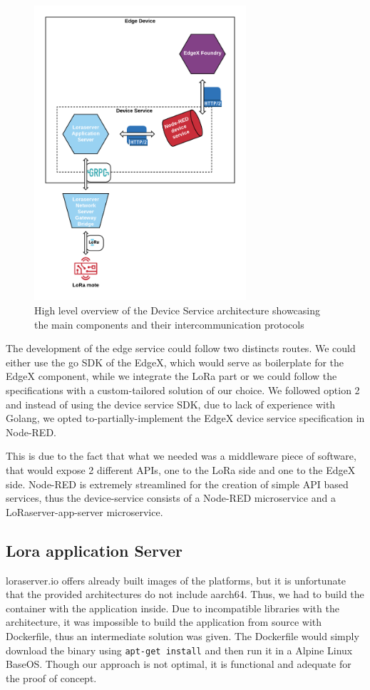 \begin{figure}[h]
    \centering
    \includegraphics[width=0.7\textwidth]{images/dev_serv_arch.png}
    \caption{High level overview of the Device Service architecture showcasing the main components and their intercommunication protocols}
    \label{fig:device_service}
\end{figure}

The development of the edge service could follow two distincts routes. We could either use the go SDK of the EdgeX, which would serve as boilerplate for the EdgeX component, while we integrate the LoRa part or we could follow the specifications with a custom-tailored solution of our choice. We followed option 2 and instead of using the device service SDK\cite{device-service-sdk}, due to lack of experience with Golang, we opted to-partially-implement the EdgeX device service specification \cite{device-service-spec} in Node-RED.

This is due to the fact that what we needed was a middleware piece of software, that would expose 2 different APIs, one to the LoRa side and one to the EdgeX side. Node-RED is extremely streamlined for the creation of simple API based services, thus the device-service consists of a Node-RED microservice and a LoRaserver-app-server microservice. 

\subsection{Lora application Server}
loraserver.io offers already built images of the platforms, but it is unfortunate that the provided architectures do not include aarch64. Thus, we had to build the container with the application inside. Due to incompatible libraries with the architecture, it was impossible to build the application from source with Dockerfile, thus an intermediate solution was given. The Dockerfile would simply download the binary using \texttt{apt-get install} and then run it in a Alpine Linux BaseOS. Though our approach is not optimal, it is functional and adequate for the proof of concept. 


